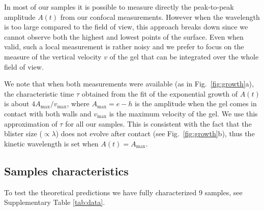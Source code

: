 \documentclass[twocolumn,superscriptaddress,showpacs,preprintnumbers,
amsmath,amssymb,prl]{revtex4-1}
\begin{document}
In most of our samples it is possible to measure directly the peak-to-peak amplitude $A(t)$ from our confocal measurements. However when the wavelength is too large compared to the field of view, this approach breaks down since we cannot observe both the highest and lowest points of the surface. Even when valid, such a local measurement is rather noisy and we prefer to focus on the measure of the vertical velocity $v$ of the gel that can be integrated over the whole field of view.

We note that when both measurements were available (as in Fig.~\ref{fig:growth}a), the characteristic time $\tau$ obtained from the fit of the exponential growth of $A(t)$ is about $4A_\text{max}/v_\text{max}$, where $A_\text{max} = e-h$ is the amplitude when the gel comes in contact with both walls and $v_\text{max}$ is the maximum velocity of the gel. We use this approximation of $\tau$ for all our samples. This is consistent with the fact that the blister size ($\propto\lambda$) does not evolve after contact (see Fig.~\ref{fig:growth}b), thus the kinetic wavelength is set when $A(t) = A_\text{max}$.


\subsection*{Samples characteristics}
To test the theoretical predictions we have fully characterized 9 samples, see Supplementary Table \ref{tab:data}.
\end{document}
